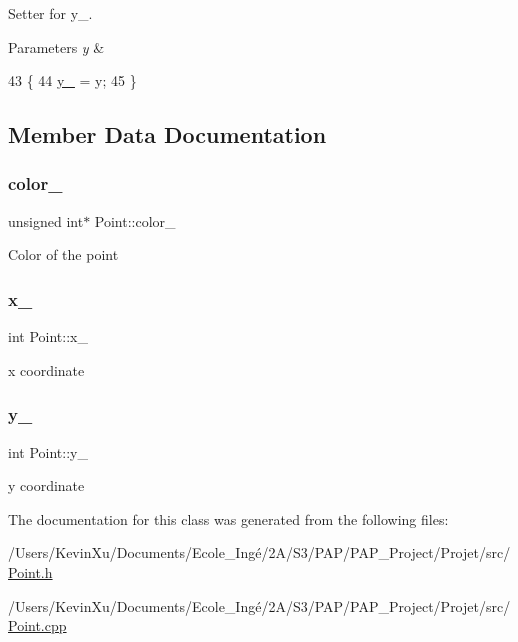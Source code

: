 Setter for y\+\_\+. 


\begin{DoxyParams}{Parameters}
{\em y} & \\
\hline
\end{DoxyParams}

\begin{DoxyCode}
43                       \{
44     \mbox{\hyperlink{class_point_ae45effa2adb0036e4a770abb9b1160e6}{y\_}} = y;
45 \}
\end{DoxyCode}


\subsection{Member Data Documentation}
\mbox{\label{class_point_af3333647d73989850d2fbf64d14eb9cb}} 
\subsubsection{\texorpdfstring{color\+\_\+}{color\_}}
{\footnotesize\ttfamily unsigned int$\ast$ Point\+::color\+\_\+\hspace{0.3cm}{\ttfamily [private]}}

Color of the point \mbox{\label{class_point_acfe156c55546f7e551fb54c7ea08a6cb}} 
\subsubsection{\texorpdfstring{x\+\_\+}{x\_}}
{\footnotesize\ttfamily int Point\+::x\+\_\+\hspace{0.3cm}{\ttfamily [private]}}

x coordinate \mbox{\label{class_point_ae45effa2adb0036e4a770abb9b1160e6}} 
\subsubsection{\texorpdfstring{y\+\_\+}{y\_}}
{\footnotesize\ttfamily int Point\+::y\+\_\+\hspace{0.3cm}{\ttfamily [private]}}

y coordinate 

The documentation for this class was generated from the following files\+:\begin{DoxyCompactItemize}
\item 
/\+Users/\+Kevin\+Xu/\+Documents/\+Ecole\+\_\+\+Ingé/2\+A/\+S3/\+P\+A\+P/\+P\+A\+P\+\_\+\+Project/\+Projet/src/\mbox{\hyperlink{_point_8h}{Point.\+h}}\item 
/\+Users/\+Kevin\+Xu/\+Documents/\+Ecole\+\_\+\+Ingé/2\+A/\+S3/\+P\+A\+P/\+P\+A\+P\+\_\+\+Project/\+Projet/src/\mbox{\hyperlink{_point_8cpp}{Point.\+cpp}}\end{DoxyCompactItemize}
